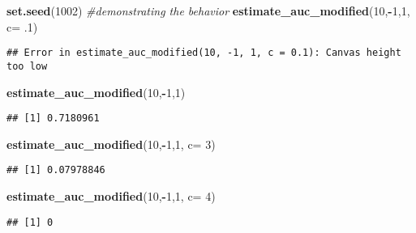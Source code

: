\documentclass[
]{article}
\newenvironment{Shaded}{\begin{snugshade}}{\end{snugshade}}
\newcommand{\CommentTok}[1]{\textcolor[rgb]{0.56,0.35,0.01}{\textit{#1}}}
\newcommand{\DataTypeTok}[1]{\textcolor[rgb]{0.13,0.29,0.53}{#1}}
\newcommand{\DecValTok}[1]{\textcolor[rgb]{0.00,0.00,0.81}{#1}}
\newcommand{\FloatTok}[1]{\textcolor[rgb]{0.00,0.00,0.81}{#1}}
\newcommand{\KeywordTok}[1]{\textcolor[rgb]{0.13,0.29,0.53}{\textbf{#1}}}
\newcommand{\NormalTok}[1]{#1}
\newcommand{\OperatorTok}[1]{\textcolor[rgb]{0.81,0.36,0.00}{\textbf{#1}}}
\begin{document}
\begin{Shaded}
\begin{Highlighting}[]
\KeywordTok{set.seed}\NormalTok{(}\DecValTok{1002}\NormalTok{)}
\CommentTok{#demonstrating the behavior}
\KeywordTok{estimate_auc_modified}\NormalTok{(}\DecValTok{10}\NormalTok{,}\OperatorTok{-}\DecValTok{1}\NormalTok{,}\DecValTok{1}\NormalTok{, }\DataTypeTok{c=} \FloatTok{.1}\NormalTok{)}
\end{Highlighting}
\end{Shaded}

\begin{verbatim}
## Error in estimate_auc_modified(10, -1, 1, c = 0.1): Canvas height too low
\end{verbatim}

\begin{Shaded}
\begin{Highlighting}[]
\KeywordTok{estimate_auc_modified}\NormalTok{(}\DecValTok{10}\NormalTok{,}\OperatorTok{-}\DecValTok{1}\NormalTok{,}\DecValTok{1}\NormalTok{)}
\end{Highlighting}
\end{Shaded}

\begin{verbatim}
## [1] 0.7180961
\end{verbatim}

\begin{Shaded}
\begin{Highlighting}[]
\KeywordTok{estimate_auc_modified}\NormalTok{(}\DecValTok{10}\NormalTok{,}\OperatorTok{-}\DecValTok{1}\NormalTok{,}\DecValTok{1}\NormalTok{, }\DataTypeTok{c=} \DecValTok{3}\NormalTok{)}
\end{Highlighting}
\end{Shaded}

\begin{verbatim}
## [1] 0.07978846
\end{verbatim}

\begin{Shaded}
\begin{Highlighting}[]
\KeywordTok{estimate_auc_modified}\NormalTok{(}\DecValTok{10}\NormalTok{,}\OperatorTok{-}\DecValTok{1}\NormalTok{,}\DecValTok{1}\NormalTok{, }\DataTypeTok{c=} \DecValTok{4}\NormalTok{)}
\end{Highlighting}
\end{Shaded}

\begin{verbatim}
## [1] 0
\end{verbatim}
\end{document}
